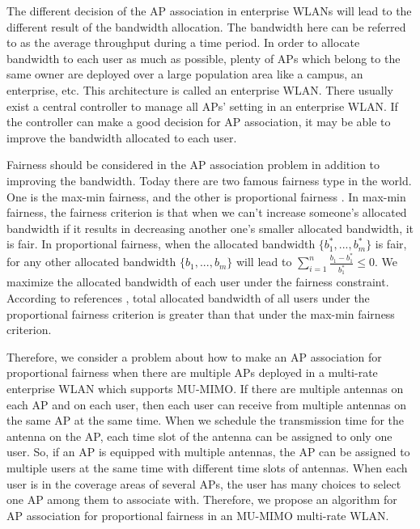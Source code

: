 	The different decision of the AP association in enterprise WLANs will lead to the different result of the bandwidth allocation. The bandwidth here can be referred to as the average throughput during a time period. In order to allocate bandwidth to each user as much as possible, plenty of APs which belong to the same owner are deployed over a large population area like a campus, an enterprise, etc. This architecture is called an enterprise WLAN. There usually exist a central controller to manage all APs' setting in an enterprise WLAN. If the controller can make a good decision for AP association, it may be able to improve the bandwidth allocated to each user.
	
	Fairness should be considered in the AP association problem in addition to improving the bandwidth. Today there are two famous fairness type in the world. One is the max-min fairness, and the other is proportional fairness \cite{kelly1997charging}. In max-min fairness, the fairness criterion is that when we can't increase someone's allocated bandwidth if it results in decreasing another one's smaller allocated bandwidth, it is fair. In proportional fairness, when the allocated bandwidth $\{b_1^*,...,b_m^*\}$ is fair, for any other allocated bandwidth $ \{b_1,...,b_m\}$ will lead to $ \sum_{i=1}^{n} \frac{b_1-b_1^*}{b_1^*} \le 0 $. We maximize the allocated bandwidth of each user under the fairness constraint. According to references \cite{li2008proportional}, total allocated bandwidth of all users under the proportional fairness criterion is greater than that under the max-min fairness criterion.
	
	Therefore, we consider a problem about how to make an AP association for proportional fairness when there are multiple APs deployed in a multi-rate enterprise WLAN which supports MU-MIMO. If there are multiple antennas on each AP and on each user, then each user can receive from multiple antennas on the same AP at the same time. When we schedule the transmission time for the antenna on the AP, each time slot of the antenna can be assigned to only one user. So, if an AP is equipped with multiple antennas, the AP can be assigned to multiple users at the same time with different time slots of antennas. When each user is in the coverage areas of several APs, the user has many choices to select one AP among them to associate with. Therefore, we propose an algorithm for AP association for proportional fairness in an MU-MIMO multi-rate WLAN. 
	
	
